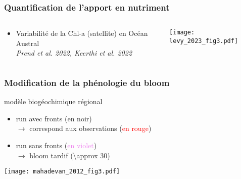 \documentclass[11pt, french, aspectratio=32]{beamer}
\begin{document}
\begin{frame}
  \frametitle{Quantification de l'apport en nutriment}
  \begin{columns}
    \begin{column}{0.5\linewidth}
      \begin{itemize}
        \item Variabilité de la Chl-a (satellite) en Océan Austral
              \\
              {\footnotesize\textit{Prend et al. 2022, Keerthi et al. 2022}}
      \end{itemize}
    \end{column}
    \begin{column}{0.5\linewidth}
      \texttt{[image: levy\_2023\_fig3.pdf]}
    \end{column}
  \end{columns}

  \vspace*{2em}

\end{frame}


\endgroup


\begin{frame}
  \frametitle{Modification de la phénologie du bloom}

  \begin{block}{}
    modèle biogéochimique régional
    \begin{itemize}
      \item run avec fronts (en noir)
            \\\(\rightarrow\) correspond aux observations (\textcolor{red}{en rouge})
      \item<2-> run sans fronts (\textcolor{violet}{en violet})
            \\\(\rightarrow\) bloom tardif (\qty{\approx 30}{})
    \end{itemize}
  \end{block}

  \texttt{[image: mahadevan\_2012\_fig3.pdf]}
  {\hspace{1em}\footnotesize\textit{\raisebox{2em}{Mahadevan et al.\ 2012}}}
\end{frame}
\end{document}
